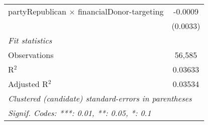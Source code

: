 \begin{tabular}{lc}
   partyRepublican $\times$ financialDonor-targeting  & -0.0009\\   
                                                      & (0.0033)\\   
   \midrule
   \emph{Fit statistics}\\
   Observations                                       & 56,585\\  
   R$^2$                                              & 0.03633\\  
   Adjusted R$^2$                                     & 0.03534\\  
   \midrule \midrule
   \multicolumn{2}{l}{\emph{Clustered (candidate) standard-errors in parentheses}}\\
   \multicolumn{2}{l}{\emph{Signif. Codes: ***: 0.01, **: 0.05, *: 0.1}}\\
\end{tabular}
\par\endgroup


